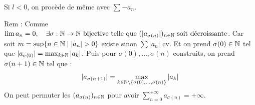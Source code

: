 \begin{solution}
Si $l < 0$, on procède de même avec $\sum -a_n$.

\begin{remarkbox}
Rem : Comme $\lim a_n = 0, \quad \exists \sigma : \mathbb N \to \mathbb N \text{ bijective telle que } (|a_{\sigma(n)}|)_{n \in \mathbb N} \text{ soit décroissante}$.
Car soit $m = \sup\{n \in \mathbb N \mid |a_n| > 0\}$ existe sinon $\sum |a_n|$ cv.
Et on prend $\sigma(0) \in \mathbb N$ tel que $|a_{\sigma(0)}| = \max_{k \in \mathbb N} |a_k|$.
Puis pour $\sigma(0), \dots, \sigma(n)$ construits, on prend $\sigma(n+1) \in \mathbb N$ tel que :
\[ |a_{\sigma(n+1)}| = \max_{k \in \mathbb N \setminus \{\sigma(0), \dots, \sigma(n)\}} |a_k| \]
On peut permuter les $(a_{\sigma(n)})_{n \in \mathbb N}$ pour avoir $\sum_{n=0}^{+\infty} a_{\sigma(n)} = +\infty$.
\end{remarkbox}
\end{solution}

